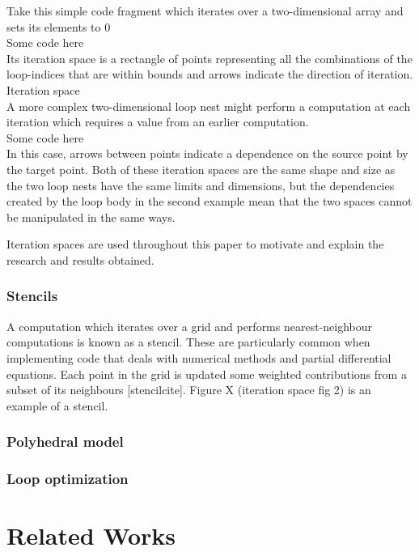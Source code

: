 \documentclass[a4paper,12pt,twoside]{report}
\begin{document}
\begin{itemize}
Take this simple code fragment which iterates over a two-dimensional array and sets its elements to 0
\\ Some code here \\
Its iteration space is a rectangle of points representing all the combinations of the loop-indices that are within bounds and
arrows indicate the direction of iteration.
\\ Iteration space \\

A more complex two-dimensional loop nest might perform a computation at each iteration which requires a value from an earlier
computation.
\\ Some code here \\
In this case, arrows between points indicate a dependence on the source point by the target point. Both of these iteration 
spaces are the same shape and size as the two loop nests have the same limits and dimensions, but the
dependencies created by the loop body in the second example mean that the two spaces cannot be manipulated in the same ways.

Iteration spaces are used throughout this paper to motivate and explain the research and results obtained.

\subsubsection{Stencils}
A computation which iterates over a grid and performs nearest-neighbour computations is known as a stencil. These are
particularly common when implementing code that deals with numerical methods and partial differential equations.
Each point in the grid is updated some weighted contributions from a subset of its neighbours [stencilcite]. Figure X (iteration
space fig 2) is an example of a stencil.

\subsubsection{Polyhedral model}

\subsubsection{Loop optimization}

\section{Related Works}


\end{itemize}
\end{document}
